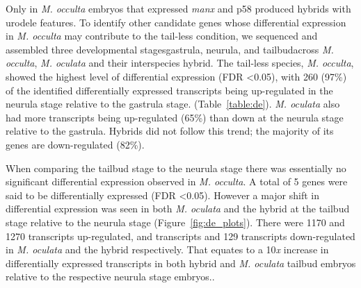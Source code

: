 Only in \textit{M. occulta} embryos that expressed \textit{manx} and p58 produced hybrids with urodele features. To identify other candidate genes whose differential expression in \textit{M. occulta} may contribute to the tail-less condition, we sequenced and assembled three developmental stages\textemdash gastrula, neurula, and tailbud\textemdash across \textit{M. occulta}, \textit{M. oculata} and their interspecies hybrid. The tail-less species, \textit{M. occulta}, showed the highest level of differential expression (FDR \textless 0.05), with 260 (97\%) of the identified differentially expressed transcripts being up-regulated in the neurula stage relative to the gastrula stage. (Table~\ref{table:de}). \textit{M. oculata} also had more transcripts being up-regulated (65\%) than down at the neurula stage relative to the gastrula. Hybrids did not follow this trend; the majority of its genes are down-regulated (82\%).  

When comparing the tailbud stage to the neurula stage there was essentially no significant differential expression observed in \textit{M. occulta}. A total of 5 genes were said to be differentially expressed (FDR \textless 0.05). However a major shift in differential expression was seen in both \textit{M. oculata} and the hybrid at the tailbud stage relative to the neurula stage (Figure~\ref{fig:de_plots}). There were 1170 and 1270 transcripts up-regulated, and transcripts and 129 transcripts down-regulated in \textit{M. oculata} and the hybrid respectively. That equates to a 10\textit{x} increase in differentially expressed transcripts in both hybrid and \textit{M. oculata} tailbud embryos relative to the respective neurula stage embryos..

